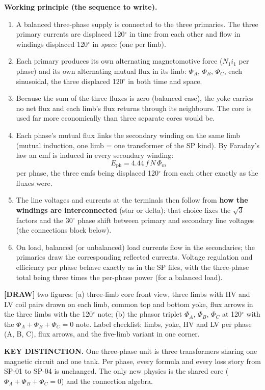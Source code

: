 \documentclass[11pt]{article}
\newcommand{\keydist}[1]{\vspace{2pt}\textbf{\color{red}KEY DISTINCTION.} #1}
\newcommand{\drawline}[1]{\textbf{\color{muted}[DRAW]} #1}
\begin{document}
\textbf{Working principle (the sequence to write).}
\begin{enumerate}[label=\arabic*.]
\item A balanced three-phase supply is connected to the three primaries. The three primary currents are displaced 120$^\circ$ in time from each other and flow in windings displaced 120$^\circ$ in \emph{space} (one per limb).
\item Each primary produces its own alternating magnetomotive force ($N_1 i_1$ per phase) and its own alternating mutual flux in its limb: $\Phi_A$, $\Phi_B$, $\Phi_C$, each sinusoidal, the three displaced 120$^\circ$ in both time and space.
\item Because the sum of the three fluxes is zero (balanced case), the yoke carries no net flux and each limb's flux returns through its neighbours. The core is used far more economically than three separate cores would be.
\item Each phase's mutual flux links the secondary winding on the same limb (mutual induction, one limb = one transformer of the SP kind). By Faraday's law an emf is induced in every secondary winding:
\[
E_{\text{ph}} = 4.44\, f\, N\, \Phi_m
\]
per phase, the three emfs being displaced 120$^\circ$ from each other exactly as the fluxes were.
\item The line voltages and currents at the terminals then follow from \textbf{how the windings are interconnected} (star or delta): that choice fixes the $\sqrt{3}$ factors and the 30$^\circ$ phase shift between primary and secondary line voltages (the connections block below).
\item On load, balanced (or unbalanced) load currents flow in the secondaries; the primaries draw the corresponding reflected currents. Voltage regulation and efficiency per phase behave exactly as in the SP files, with the three-phase total being three times the per-phase power (for a balanced load).
\end{enumerate}

\drawline{two figures: (a) three-limb core front view, three limbs with HV and LV coil pairs drawn on each limb, common top and bottom yoke, flux arrows in the three limbs with the 120$^\circ$ note; (b) the phasor triplet $\Phi_A$, $\Phi_B$, $\Phi_C$ at 120$^\circ$ with the $\Phi_A + \Phi_B + \Phi_C = 0$ note. Label checklist: limbs, yoke, HV and LV per phase (A, B, C), flux arrows, and the five-limb variant in one corner.}

\keydist{One three-phase unit is three transformers sharing one magnetic circuit and one tank. Per phase, every formula and every loss story from SP-01 to SP-04 is unchanged. The only new physics is the shared core ($\Phi_A + \Phi_B + \Phi_C = 0$) and the connection algebra.}
\end{document}
